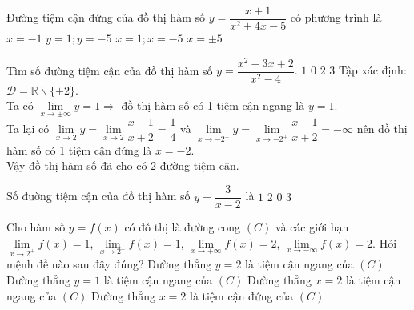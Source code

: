 \begin{ex}
	Đường tiệm cận đứng của đồ thị hàm số $y=\dfrac{x+1}{x^2+4x-5}$ có phương trình là
	\choice
	{$x=-1$}
	{$y=1;y=-5$}
	{\True $x=1;x=-5$}
	{$x=\pm 5$}
\end{ex}

\begin{ex}
	Tìm số đường tiệm cận của đồ thị hàm số $ y = \dfrac{x^2 - 3x + 2}{x^2 - 4}. $
	\choice
	{$1$}
	{$ 0$}
	{\True $2$}
	{$3$}
	\loigiai
	{
		Tập xác định: $ \mathscr D = \mathbb{R} \backslash \{\pm2 \} $.\\
		Ta có $ \lim \limits_{x \to \pm  \infty} y = 1 \Rightarrow  $ đồ thị hàm số có 1 tiệm cận ngang là $ y = 1. $\\
		Ta lại có $\lim \limits_{x \to 2} y =  \lim \limits_{x \to 2} \dfrac{x-1}{x+2} = \dfrac{1}{4} $ và $\lim \limits_{x \to -2^+} y =  \lim \limits_{x \to -2^+} \dfrac{x-1}{x+2} = -\infty$ nên đồ thị hàm số có 1 tiệm cận đứng là $ x = -2. $\\
		Vậy đồ thị hàm số đã cho có 2 đường tiệm cận.
	}
\end{ex}

\begin{ex}
	Số đường tiệm cận của đồ thị hàm số $y=\dfrac{3}{x-2}$ là
	\choice
	{$1$}
	{\True $2$}
	{$0$}
	{$3$}
\end{ex}

\begin{ex}
	Cho hàm số $y=f(x)$ có đồ thị là đường cong $(C)$ và các giới hạn $\lim\limits_{x\to 2^{+}}f(x)=1$, $\lim\limits_{x\to 2^{-}}f(x)=1$, $\lim\limits_{x\to +\infty}f(x)=2$, $\lim\limits_{x\to -\infty}f(x)=2$. Hỏi mệnh đề nào sau đây đúng?
	\choice
	{\True Đường thẳng $y=2$ là tiệm cận ngang của $(C)$}
	{Đường thẳng $y=1$ là tiệm cận ngang của $(C)$}
	{Đường thẳng $x=2$ là tiệm cận ngang của $(C)$}
	{Đường thẳng $x=2$ là tiệm cận đứng của $(C)$}
\end{ex}


